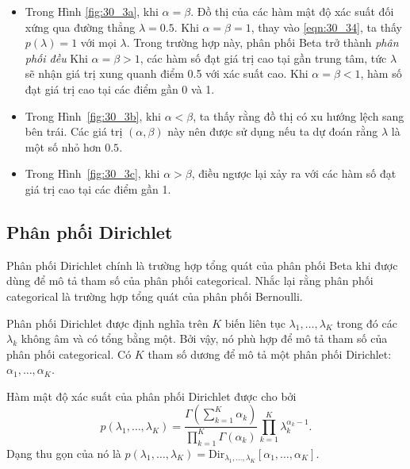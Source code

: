 \begin{itemize}

    \item Trong Hình \ref{fig:30_3a}, khi $\alpha =\beta$. Đồ thị của các hàm
    mật độ xác suất đối xứng qua đường thẳng $\lambda = 0.5$. Khi $\alpha =
    \beta = 1$, thay vào \eqref{eqn:30_34}, ta thấy $p(\lambda) = 1$ với mọi
    $\lambda$. Trong trường hợp này, phân phối Beta trở thành \textit{phân phối
    đều} Khi $\alpha = \beta > 1$, các hàm số đạt giá trị cao tại gần trung tâm,
    tức $\lambda$ sẽ nhận giá trị xung quanh điểm 0.5 với xác suất cao. Khi
    $\alpha = \beta < 1$, hàm số đạt giá trị cao tại các điểm gần 0 và 1.    %

    \item Trong Hình~\ref{fig:30_3b}, khi $\alpha < \beta$, ta thấy rằng đồ thị
    có xu hướng lệch sang bên trái. Các giá trị $(\alpha, \beta)$ này nên được
    sử dụng nếu ta dự đoán rằng $\lambda$ là một số nhỏ hơn $0.5$.

    \item Trong Hình~\ref{fig:30_3c}, khi $\alpha > \beta$, điều ngược lại xảy
    ra với các hàm số đạt giá trị cao tại các điểm gần 1.
\end{itemize}


\subsection{Phân phối Dirichlet}

Phân phối Dirichlet chính là trường hợp tổng quát của phân phối Beta khi được
dùng để mô tả tham số của phân phối categorical. Nhắc lại rằng phân phối
categorical là trường hợp tổng quát của phân phối Bernoulli.

Phân phối Dirichlet được định nghĩa trên $K$ biến liên tục $\lambda_1, \dots,
\lambda_K$ trong đó các $\lambda_k$ không âm và có tổng bằng một. Bởi vậy, nó
phù hợp để mô tả tham số của phân phối categorical.
Có $K$ tham số {dương} để mô tả một phân phối Dirichlet:
$\alpha_1, \dots, \alpha_K$.

Hàm mật độ xác suất của phân phối Dirichlet được cho bởi
\begin{equation}
\label{eqn:30_35}
  p(\lambda_1, \dots, \lambda_K) = \frac{\Gamma(\sum_{k=1}^K \alpha_k)}{\prod_{k=1}^K\Gamma(\alpha_k)} \prod_{k=1}^K \lambda_k^{\alpha_k - 1}.
\end{equation}
Dạng thu gọn của nó là  
  $p(\lambda_1, \dots, \lambda_K) = \text{Dir}_{\lambda_1, \dots, \lambda_K}[\alpha_1, \dots, \alpha_K]$.


